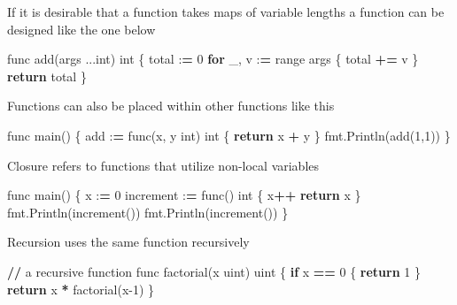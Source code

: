 \documentclass[]{book}
\newenvironment{Shaded}{\begin{snugshade}}{\end{snugshade}}
\newcommand{\BuiltInTok}[1]{#1}
\newcommand{\ControlFlowTok}[1]{\textcolor[rgb]{0.13,0.29,0.53}{\textbf{#1}}}
\newcommand{\DecValTok}[1]{\textcolor[rgb]{0.00,0.00,0.81}{#1}}
\newcommand{\NormalTok}[1]{#1}
\newcommand{\OperatorTok}[1]{\textcolor[rgb]{0.81,0.36,0.00}{\textbf{#1}}}
\begin{document}
If it is desirable that a function takes maps of variable lengths a function can be designed like the one below

\begin{Shaded}
\begin{Highlighting}[]
\NormalTok{func add(args ...}\BuiltInTok{int}\NormalTok{) }\BuiltInTok{int}\NormalTok{ \{ }
\NormalTok{    total :}\OperatorTok{=} \DecValTok{0}              
    \ControlFlowTok{for}\NormalTok{ _, v :}\OperatorTok{=} \BuiltInTok{range}\NormalTok{ args \{}
\NormalTok{        total }\OperatorTok{+=}\NormalTok{ v          }
\NormalTok{    \}                       }
    \ControlFlowTok{return}\NormalTok{ total            }
\NormalTok{\}  }
\end{Highlighting}
\end{Shaded}

Functions can also be placed within other functions like this

\begin{Shaded}
\begin{Highlighting}[]
\NormalTok{func main() \{}
\NormalTok{  add :}\OperatorTok{=}\NormalTok{ func(x, y }\BuiltInTok{int}\NormalTok{) }\BuiltInTok{int}\NormalTok{ \{}
    \ControlFlowTok{return}\NormalTok{ x }\OperatorTok{+}\NormalTok{ y}
\NormalTok{  \}}
\NormalTok{  fmt.Println(add(}\DecValTok{1}\NormalTok{,}\DecValTok{1}\NormalTok{))}
\NormalTok{\}}
\end{Highlighting}
\end{Shaded}

Closure refers to functions that utilize non-local variables

\begin{Shaded}
\begin{Highlighting}[]
\NormalTok{func main() \{}
\NormalTok{  x :}\OperatorTok{=} \DecValTok{0}
\NormalTok{  increment :}\OperatorTok{=}\NormalTok{ func() }\BuiltInTok{int}\NormalTok{ \{}
\NormalTok{    x}\OperatorTok{++}
    \ControlFlowTok{return}\NormalTok{ x}
\NormalTok{  \}}
\NormalTok{  fmt.Println(increment())}
\NormalTok{  fmt.Println(increment())}
\NormalTok{\}}
\end{Highlighting}
\end{Shaded}

Recursion uses the same function recursively

\begin{Shaded}
\begin{Highlighting}[]
\OperatorTok{//}\NormalTok{ a recursive function      }
\NormalTok{func factorial(x uint) uint \{}
    \ControlFlowTok{if}\NormalTok{ x }\OperatorTok{==} \DecValTok{0}\NormalTok{ \{              }
        \ControlFlowTok{return} \DecValTok{1}             
\NormalTok{    \}                        }
    \ControlFlowTok{return}\NormalTok{ x }\OperatorTok{*}\NormalTok{ factorial(x}\DecValTok{-1}\NormalTok{)}
\NormalTok{\}      }
\end{Highlighting}
\end{Shaded}
\end{document}
